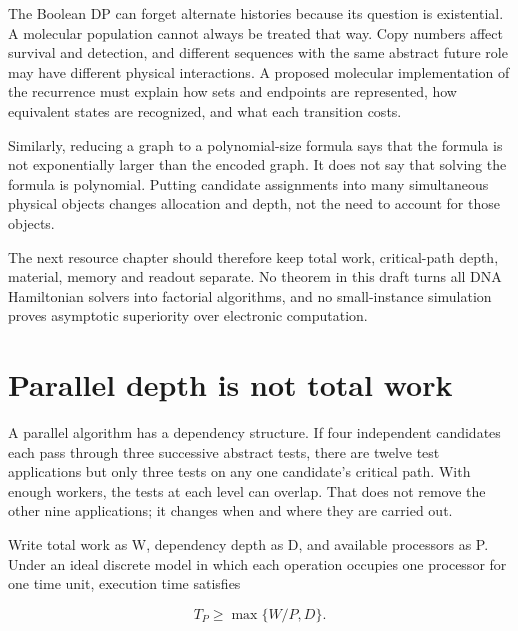 The Boolean DP can forget alternate histories because its question is
existential. A molecular population cannot always be treated that way.
Copy numbers affect survival and detection, and different sequences with
the same abstract future role may have different physical interactions.
A proposed molecular implementation of the recurrence must explain how
sets and endpoints are represented, how equivalent states are
recognized, and what each transition costs.

Similarly, reducing a graph to a polynomial-size formula says that the
formula is not exponentially larger than the encoded graph. It does not
say that solving the formula is polynomial. Putting candidate
assignments into many simultaneous physical objects changes allocation
and depth, not the need to account for those objects.

The next resource chapter should therefore keep total work,
critical-path depth, material, memory and readout separate. No theorem
in this draft turns all DNA Hamiltonian solvers into factorial
algorithms, and no small-instance simulation proves asymptotic
superiority over electronic computation.

\section{Parallel depth is not total
work}\label{parallel-depth-is-not-total-work}

A parallel algorithm has a dependency structure. If four independent
candidates each pass through three successive abstract tests, there are
twelve test applications but only three tests on any one candidate's
critical path. With enough workers, the tests at each level can overlap.
That does not remove the other nine applications; it changes when and
where they are carried out.


Write total work as W, dependency depth as D, and available processors
as P. Under an ideal discrete model in which each operation occupies one
processor for one time unit, execution time satisfies

\begin{equation}
T_P\ge\max\{W/P,D\}.
\end{equation}

